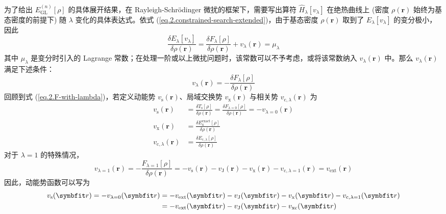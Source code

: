 为了给出 $E_\mathrm{GL}^{(n)} [\rho]$ 的具体展开结果，在 Rayleigh-Schr\"odinger 微扰的框架下，需要写出算符 $\hat H_\lambda [v_\lambda]$ 在绝热曲线上 (密度 $\rho(\bm{r})$ 始终为基态密度的前提下) 随 $\lambda$ 变化的具体表达式。依式 (\ref{eq.2.constrained-search-extended})，由于基态密度 $\rho(\bm{r})$ 取到了 $E_\lambda[v_\lambda]$ 的变分极小，因此
\begin{equation*}
  \frac{\delta E_\lambda[v_\lambda]}{\delta \rho(\bm{r})} = \frac{\delta F_\lambda [\rho]}{\delta \rho(\bm{r})} + v_{\lambda}(\bm{r}) = \mu_\lambda
\end{equation*}
其中 $\mu_\lambda$ 是变分时引入的 Lagrange 常数；在处理一阶或以上微扰问题时，该常数可以不予考虑，或将该常数纳入 $v_\lambda(\bm{r})$ 中。那么 $v_\lambda(\bm{r})$ 满足下述条件：
\begin{equation}
  v_\lambda(\bm{r}) = - \frac{\delta F_\lambda [\rho]}{\delta \rho(\bm{r})}
\end{equation}
回顾到式 (\ref{eq.2.F-with-lambda})，若定义动能势 $v_\mathrm{s} (\bm{r})$、局域交换势 $v_\mathrm{x} (\bm{r})$ 与相关势 $v_{\mathrm{c}, \lambda} (\bm{r})$ 为
\begin{align}
  v_\mathrm{s}(\bm{r}) &= \frac{\delta T_\mathrm{s} [\rho]}{\delta \rho(\bm{r})} = \frac{\delta F_{\lambda=0} [\rho]}{\delta \rho(\bm{r})} = - v_{\lambda=0}(\bm{r}) \\
  \label{eq.2.v-x}
  v_\mathrm{x} (\bm{r}) &= \frac{\delta E_\mathrm{x}^\mathrm{exact} [\rho]}{\delta \rho(\bm{r})} \\
  \label{eq.2.v-c-lambda}
  v_{\mathrm{c}, \lambda} (\bm{r}) &= \frac{\delta E_{\mathrm{c}, \lambda} [\rho]}{\delta \rho(\bm{r})}
\end{align}
对于 $\lambda = 1$ 的特殊情况，
\begin{equation}
  v_{\lambda=1}(\bm{r}) = - \frac{F_{\lambda=1} [\rho]}{\delta \rho(\bm{r})} = - v_\mathrm{s}(\bm{r}) - v_\mathrm{J}(\bm{r}) - v_\mathrm{x}(\bm{r}) - v_{\mathrm{c}, \lambda=1}(\bm{r}) = v_\mathrm{ext}(\bm{r})
\end{equation}
因此，动能势函数可以写为
\begin{align}
  v_\mathrm{s}(\bm{r}) = - v_{\lambda=0} (\bm{r}) &= - v_\mathrm{ext}(\bm{r}) - v_\mathrm{J}(\bm{r}) - v_\mathrm{x}(\bm{r}) - v_{\mathrm{c}, \lambda=1}(\bm{r}) \notag\\
  &= - v_\mathrm{ext}(\bm{r}) - v_\mathrm{J}(\bm{r}) - v_\mathrm{xc}(\bm{r})
\end{align}

